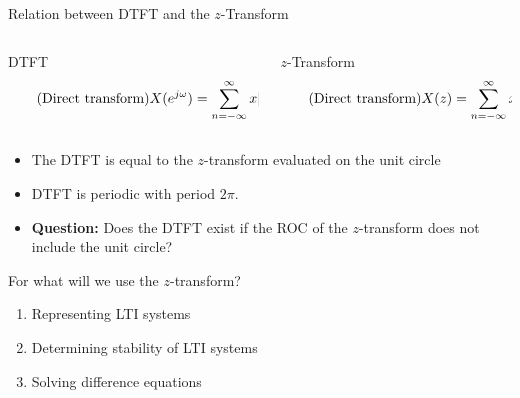 \documentclass[10pt, aspectratio=169]{beamer}
\begin{document}
%
\begin{frame}{Relation between DTFT and the $z$-Transform}

\begin{columns}[t]
	\begin{column}{0.5\textwidth}
		\begin{block}{DTFT}
			\vspace{-0.5cm}
			\begin{equation} \tag{Direct transform}
			X(e^{j\omega}) = \sum_{n=-\infty}^{\infty} x[n]\tikz[baseline]{
				\node[fill=blue!20,anchor=base] (t1) {$e^{-j\omega n}$};
			}
			\end{equation}
		\end{block}
	\end{column}
	\begin{column}{0.5\textwidth}
		\begin{block}{$z$-Transform}
			\vspace{-0.2cm}
			\begin{equation} \tag{Direct transform}
			X(z) = \sum_{n=-\infty}^{\infty} x[n]\tikz[baseline]{
				\node[fill=blue!20,anchor=base] (t1) {$z^{-n}$};
			}
			\end{equation}
		\end{block}
	\end{column}
\end{columns}
\vspace{0.4cm}
\begin{itemize}
	\pause\item The DTFT is equal to the $z$-transform evaluated on the unit circle
	\item DTFT is periodic with period $2\pi$.
	\pause\item \textbf{Question:} Does the DTFT exist if the ROC of the $z$-transform does not include the unit circle?
\end{itemize}

\vspace{-0.4cm}
\flushright
\resizebox{0.25\linewidth}{!}{}
\end{frame}

%
\begin{frame}{For what will we use the $z$-transform?}
	\begin{enumerate}
		\item Representing LTI systems
		\item Determining stability of LTI systems
		\item Solving difference equations
	\end{enumerate}
\end{frame}
\end{document}
